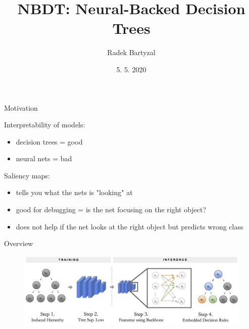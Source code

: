 \documentclass{beamer}
\begin{document}
\title[NBDT]{NBDT: Neural-Backed Decision Trees}  
\author{Radek Bartyzal}
\date{5. 5. 2020} 

\frame{\titlepage} 

\begin{frame}{Motivation}

Interpretability of models:
\begin{itemize}
\item decision trees = good
\item neural nets = bad
\end{itemize}

\vfill

Saliency maps:
\begin{itemize}
\item tells you what the nets is "looking" at
\item good for debugging = is the net focusing on the right object?
\item does not help if the net looks at the right object but predicts wrong class
\end{itemize}

\end{frame}



\begin{frame}{Overview}

\begin{figure}[h]
\includegraphics[width=\textwidth]{img/train}
\caption{}
\end{figure}

\end{frame}
\end{document}
